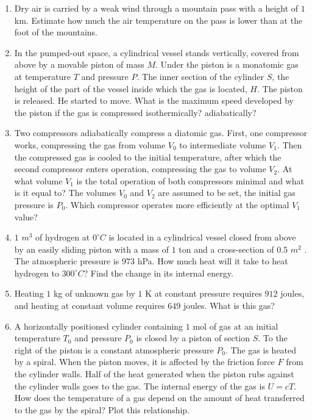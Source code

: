 \documentclass{article}
\begin{document}
\begin{enumerate}[label=5.6.\arabic*]
\item Dry air is carried by a weak wind through a mountain pass with a height of $1$ km. Estimate how much the air temperature on the pass is lower than at the foot of the mountains.

\item In the pumped-out space, a cylindrical vessel stands vertically, covered from above by a movable piston of mass $M$. Under the piston is a monatomic gas at temperature $T$ and pressure $P$. The inner section of the cylinder $S$, the height of the part of the vessel inside which the gas is located, $H$. The piston is released. He started to move. What is the maximum speed developed by the piston if the gas is compressed isothermically? adiabatically?

\item Two compressors adiabatically compress a diatomic gas. First, one compressor works, compressing the gas from volume $V_0$ to intermediate volume $V_1$. Then the compressed gas is cooled to the initial temperature, after which the second compressor enters operation, compressing the gas to volume $V_2$. At what volume $V_1$ is the total operation of both compressors minimal and what is it equal to? The volumes $V_0$ and $V_2$ are assumed to be set, the initial gas pressure is $P_0$. Which compressor operates more efficiently at the optimal $V_1$ value?

\item $1$ $m^3$ of hydrogen at $0^\circ C$ is located in a cylindrical vessel closed from above by an easily sliding piston with a mass of $1$ ton and a cross-section of $0.5$ $m^2$ . The atmospheric pressure is $973$ hPa. How much heat will it take to heat hydrogen to $300^\circ C$? Find the change in its internal energy.
\item Heating $1$ kg of unknown gas by $1$ K at constant pressure requires $912$ joules, and heating at constant volume requires $649$ joules. What is this gas?

\item A horizontally positioned cylinder containing $1$ mol of gas at an initial temperature $T_0$ and pressure $P_0$ is closed by a piston of section $S$. To the right of the piston is a constant atmospheric pressure $P_0$. The gas is heated by a spiral. When the piston moves, it is affected by the friction force $F$ from the cylinder walls. Half of the heat generated when the piston rubs against the cylinder walls goes to the gas. The internal energy of the gas is $U = cT$. How does the temperature of a gas depend on the amount of heat transferred to the gas by the spiral? Plot this relationship.


\end{enumerate}
\end{document}
